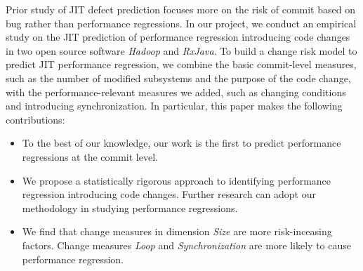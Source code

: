 Prior study of JIT defect prediction focuses more on the risk of commit based on bug rather than performance regressions. In our project, we conduct an empirical study on the JIT prediction of performance regression introducing code changes  in two open source software \emph{Hadoop} and \emph{RxJava}. To build a change risk model to predict JIT performance regression, we combine the basic commit-level measures, such as the number of modified subsystems and the purpose of the code change, with the performance-relevant measures we added, such as changing conditions and introducing synchronization. In particular, this paper makes the following contributions:
\vspace{-0.2cm}
\begin{itemize} \itemsep 0em
\item To the best of our knowledge, our work is the first to predict performance regressions at the commit level. 
\item We propose a statistically rigorous approach to identifying performance regression introducing code changes. Further research can adopt our methodology in studying performance regressions.
\item We find that change measures in dimension \emph{Size} are more risk-inceasing factors. Change measures \emph{Loop} and \emph{Synchronization} are more likely to cause performance regression.
\end{itemize}
